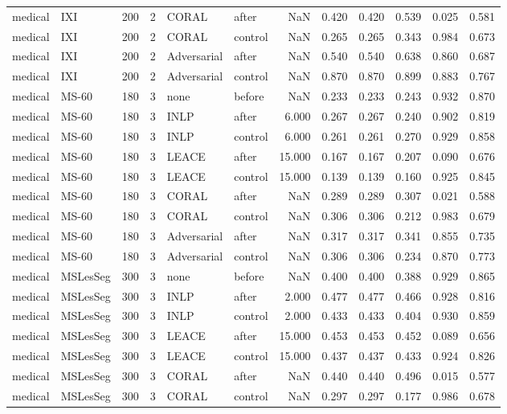 \begin{tabular}{llrrllrrrrrr}
medical & IXI & 200 & 2 & CORAL & after & NaN & 0.420 & 0.420 & 0.539 & 0.025 & 0.581 \\
medical & IXI & 200 & 2 & CORAL & control & NaN & 0.265 & 0.265 & 0.343 & 0.984 & 0.673 \\
medical & IXI & 200 & 2 & Adversarial & after & NaN & 0.540 & 0.540 & 0.638 & 0.860 & 0.687 \\
medical & IXI & 200 & 2 & Adversarial & control & NaN & 0.870 & 0.870 & 0.899 & 0.883 & 0.767 \\
medical & MS-60 & 180 & 3 & none & before & NaN & 0.233 & 0.233 & 0.243 & 0.932 & 0.870 \\
medical & MS-60 & 180 & 3 & INLP & after & 6.000 & 0.267 & 0.267 & 0.240 & 0.902 & 0.819 \\
medical & MS-60 & 180 & 3 & INLP & control & 6.000 & 0.261 & 0.261 & 0.270 & 0.929 & 0.858 \\
medical & MS-60 & 180 & 3 & LEACE & after & 15.000 & 0.167 & 0.167 & 0.207 & 0.090 & 0.676 \\
medical & MS-60 & 180 & 3 & LEACE & control & 15.000 & 0.139 & 0.139 & 0.160 & 0.925 & 0.845 \\
medical & MS-60 & 180 & 3 & CORAL & after & NaN & 0.289 & 0.289 & 0.307 & 0.021 & 0.588 \\
medical & MS-60 & 180 & 3 & CORAL & control & NaN & 0.306 & 0.306 & 0.212 & 0.983 & 0.679 \\
medical & MS-60 & 180 & 3 & Adversarial & after & NaN & 0.317 & 0.317 & 0.341 & 0.855 & 0.735 \\
medical & MS-60 & 180 & 3 & Adversarial & control & NaN & 0.306 & 0.306 & 0.234 & 0.870 & 0.773 \\
medical & MSLesSeg & 300 & 3 & none & before & NaN & 0.400 & 0.400 & 0.388 & 0.929 & 0.865 \\
medical & MSLesSeg & 300 & 3 & INLP & after & 2.000 & 0.477 & 0.477 & 0.466 & 0.928 & 0.816 \\
medical & MSLesSeg & 300 & 3 & INLP & control & 2.000 & 0.433 & 0.433 & 0.404 & 0.930 & 0.859 \\
medical & MSLesSeg & 300 & 3 & LEACE & after & 15.000 & 0.453 & 0.453 & 0.452 & 0.089 & 0.656 \\
medical & MSLesSeg & 300 & 3 & LEACE & control & 15.000 & 0.437 & 0.437 & 0.433 & 0.924 & 0.826 \\
medical & MSLesSeg & 300 & 3 & CORAL & after & NaN & 0.440 & 0.440 & 0.496 & 0.015 & 0.577 \\
medical & MSLesSeg & 300 & 3 & CORAL & control & NaN & 0.297 & 0.297 & 0.177 & 0.986 & 0.678 \\

\end{tabular}
